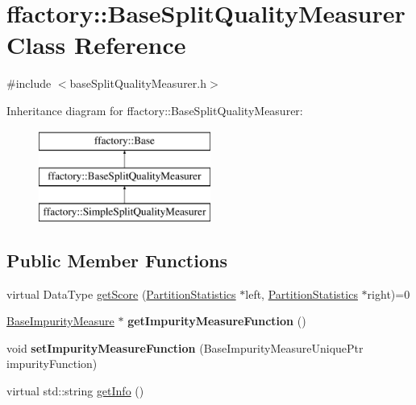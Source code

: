 \hypertarget{classffactory_1_1_base_split_quality_measurer}{\section{ffactory\-:\-:Base\-Split\-Quality\-Measurer Class Reference}
\label{classffactory_1_1_base_split_quality_measurer}
}


{\ttfamily \#include $<$base\-Split\-Quality\-Measurer.\-h$>$}

Inheritance diagram for ffactory\-:\-:Base\-Split\-Quality\-Measurer\-:\begin{figure}[H]
\begin{center}
\leavevmode
\includegraphics[height=3.000000cm]{classffactory_1_1_base_split_quality_measurer}
\end{center}
\end{figure}
\subsection*{Public Member Functions}
\begin{DoxyCompactItemize}
\item 
virtual Data\-Type \hyperlink{classffactory_1_1_base_split_quality_measurer_a64904410d1071ba5aaa6928f0ea7f1a5}{get\-Score} (\hyperlink{classffactory_1_1_partition_statistics}{Partition\-Statistics} $\ast$left, \hyperlink{classffactory_1_1_partition_statistics}{Partition\-Statistics} $\ast$right)=0
\item 
\hypertarget{classffactory_1_1_base_split_quality_measurer_a47054f960d2f5e0a6cba92ac34f38e1f}{\hyperlink{classffactory_1_1_base_impurity_measure}{Base\-Impurity\-Measure} $\ast$ {\bfseries get\-Impurity\-Measure\-Function} ()}\label{classffactory_1_1_base_split_quality_measurer_a47054f960d2f5e0a6cba92ac34f38e1f}

\item 
\hypertarget{classffactory_1_1_base_split_quality_measurer_af4dc1a72248b7c5f3eeca0c805b7488e}{void {\bfseries set\-Impurity\-Measure\-Function} (Base\-Impurity\-Measure\-Unique\-Ptr impurity\-Function)}\label{classffactory_1_1_base_split_quality_measurer_af4dc1a72248b7c5f3eeca0c805b7488e}

\item 
virtual std\-::string \hyperlink{classffactory_1_1_base_split_quality_measurer_a0bd98e9b10ef01211e0839e9a6f22d26}{get\-Info} ()
\end{DoxyCompactItemize}


